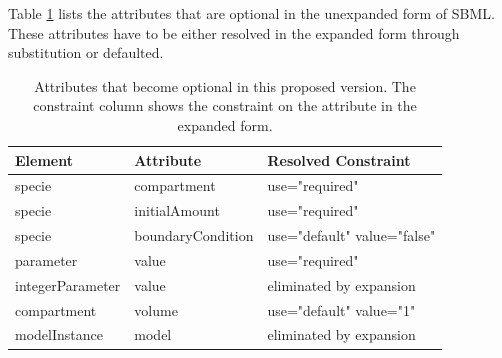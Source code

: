 \documentclass[10pt]{article}
\begin{document}
Table \ref{tab:attributes} lists the attributes that are optional
in the unexpanded form of SBML. These attributes have to be either
resolved in the expanded form through substitution or defaulted.

\begin{table}[tb]
\begin{tabular}{lll}

  \textbf{Element} & \textbf{Attribute} & \textbf{Resolved Constraint} \\

  \hline

  specie & compartment & use="required"\\
  specie & initialAmount & use="required"\\
  specie & boundaryCondition & use="default" value="false" \\
  parameter & value & use="required"\\
  integerParameter & value & eliminated by expansion\\
  compartment & volume & use="default" value="1" \\
  modelInstance & model & eliminated by expansion\\
\end{tabular}

\caption{Attributes that become optional in this proposed
version.  The constraint column shows the constraint on
the attribute in the expanded form.}

\label{tab:attributes}
\end{table}
\end{document}
